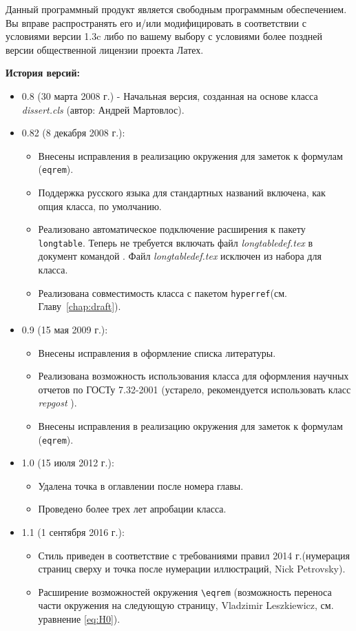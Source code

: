 Данный программный продукт является свободным программным обеспечением. Вы вправе распространять его и/или модифицировать в соответствии с условиями версии 1.3c либо по вашему выбору с условиями более поздней версии общественной лицензии проекта Латех.


\newpage
{\large \bfseries История версий:}
\begin{itemize}
 \item 0.8 (30 марта 2008 г.) - Начальная версия, созданная на основе класса {\itshape
dissert.cls} (автор: Андрей Мартовлос).
 \item 0.82 (8 декабря 2008 г.):
\begin{itemize}
 \item Внесены исправления в реализацию окружения для заметок к формулам
(\verb|eqrem|).
 \item Поддержка русского языка для стандартных названий включена, как опция
класса, по умолчанию.
 \item Реализовано автоматическое подключение расширения к пакету
\verb|longtable|. Теперь не требуется включать файл {\itshape longtabledef.tex}
в документ командой \verb||. Файл {\itshape longtabledef.tex} исключен
из набора для класса.
 \item Реализована совместимость класса с пакетом \verb|hyperref|(см.
Главу~\ref{chap:draft}).
\end{itemize}
 \item 0.9 (15 мая 2009 г.):
\begin{itemize}
 \item Внесены исправления в оформление списка литературы.
 \item Реализована возможность использования класса для оформления научных
отчетов по ГОСТу 7.32-2001 (устарело, рекомендуется использовать класс {\itshape repgost} \cite{repgost}).
 \item Внесены исправления в реализацию окружения для заметок к формулам
(\verb|eqrem|).
\end{itemize}

 \item 1.0 (15 июля 2012 г.):
\begin{itemize}
	\item Удалена точка в оглавлении после номера главы.
	\item Проведено более трех лет апробации класса.
\end{itemize}

 \item 1.1 (1 сентября 2016 г.):
\begin{itemize}
	\item Стиль приведен в соответствие с требованиями правил 2014 г.(нумерация страниц сверху и точка после нумерации иллюстраций, Nick Petrovsky).
	\item Расширение возможностей окружения \verb|\eqrem| (возможность переноса части окружения на следующую страницу, Vladzimir Leszkiewicz, см. уравнение \ref{eq:H0}).
\end{itemize}


\end{itemize}
